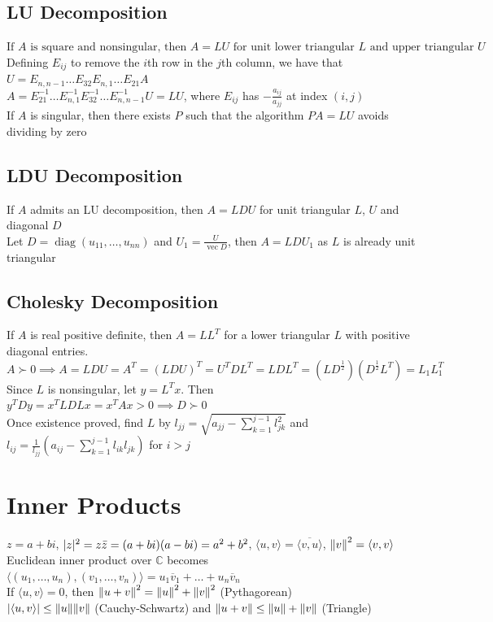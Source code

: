 \documentclass{article}
\DeclarePairedDelimiter\abs{\lvert}{\rvert}%
\DeclarePairedDelimiter\norm{\lVert}{\rVert}%
\DeclareMathOperator{\diag}{diag}
\DeclareMathOperator{\vect}{vec}
\newcommand{\C}{\mathbb{C}}
\newcommand\inner[2]{\langle #1, #2 \rangle}
\begin{document}
\subsection{LU Decomposition}
$\mbox{If }A\mbox{ is square and nonsingular, then }A = LU\mbox{ for unit lower triangular } L \mbox{ and upper triangular }U$ \\
Defining $E_{ij}$ to remove the $i$th row in the $j$th column, we have that $U = E_{n, n-1}\ldots E_{32} E_{n, 1}\ldots E_{21}A$ \\
$A = E_{21}^{-1} \ldots E_{n, 1}^{-1} E_{32}^{-1} \ldots E_{n, n-1}^{-1} U = LU$, where $E_{ij}$ has $-\frac{a_{ij}}{a_{jj}}$ at index $(i, j)$ \\
If $A$ is singular, then there exists $P$ such that the algorithm $PA = LU$ avoids dividing by zero

\subsection{LDU Decomposition}
If $A$ admits an LU decomposition, then $A = LDU$ for unit triangular $L$, $U$ and diagonal $D$ \\
Let $D = \diag (u_{11}, \ldots, u_{nn})$ and $U_1 = \frac{U}{\vect D}$, then $A = LDU_1$ as $L$ is already unit triangular

\subsection{Cholesky Decomposition}
If $A$ is real positive definite, then $A = LL^T$ for a lower triangular $L$ with positive diagonal entries. \\
$A \succ 0 \implies A = LDU = A^T = (LDU)^T = U^TDL^T = LDL^T = (LD^{\frac{1}{2}})(D^{\frac{1}{2}} L^T) = L_1L_1^T$ \\
Since $L$ is nonsingular, let $y = L^Tx$. Then $y^TDy = x^TLDLx = x^TAx > 0 \implies D \succ 0$ \\
Once existence proved, find $L$ by $l_{jj} = \sqrt{a_{jj} - \sum_{k=1}^{j-1}l_{jk}^2}$ and $l_{ij} = \frac{1}{l_{jj}}(a_{ij} - \sum_{k=1}^{j-1}l_{ik}l_{jk})$ for $i > j$

\section{Inner Products}
$z = a + bi$, $\abs z^2 =  z \bar{z} = (a+bi)(a-bi) = a^2 + b^2$, $\inner u v  = \overline{\inner v u}$, ${\norm v}^2 = \inner v v$ \\
Euclidean inner product over $\C$ becomes $\inner {(u_1, \ldots, u_n)} {(v_1, \ldots, v_n)} = u_1 \overline{v}_1 + \ldots + u_n \overline{v}_n$ \\
If $\inner u v = 0$, then ${\norm {u + v}}^2 = {\norm u }^2 + {\norm v}^2$ (Pythagorean) \\
$\abs {\inner u v} \leq \norm u \norm v$ (Cauchy-Schwartz) and $\norm{u + v} \leq \norm u + \norm v$ (Triangle)
\end{document}
